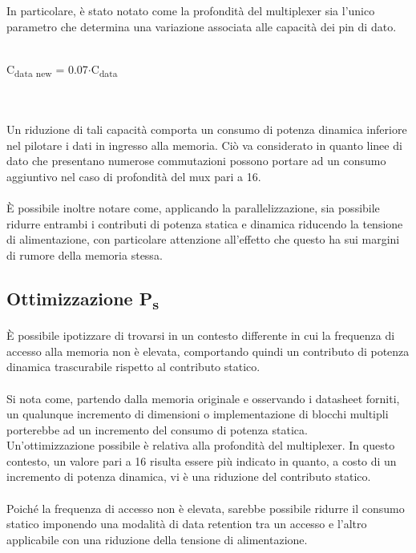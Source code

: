 \documentclass[11pt,  english, makeidx, a4paper, titlepage, oneside]{book}
\begin{document}
\\\\
In particolare, è stato notato come la profondità del multiplexer sia l'unico parametro che determina una variazione associata alle capacità dei pin di dato.
\\\\
\centerline{C\textsubscript{data new} = 0.07$\cdot$C\textsubscript{data}}
\\\\
Un riduzione di tali capacità comporta un consumo di potenza dinamica inferiore nel pilotare i dati in ingresso alla memoria. Ciò va considerato in quanto linee di dato che presentano numerose commutazioni possono portare ad un consumo aggiuntivo nel caso di profondità del mux pari a 16.
\\\\
È possibile inoltre notare come, applicando la parallelizzazione, sia possibile ridurre entrambi i contributi di potenza statica e dinamica riducendo la tensione di alimentazione, con particolare attenzione all'effetto che questo ha sui margini di rumore della memoria stessa.
\subsection{Ottimizzazione P\textsubscript{s}}
È possibile ipotizzare di trovarsi in un contesto differente in cui la frequenza di accesso alla memoria non è elevata, comportando quindi un contributo di potenza dinamica trascurabile rispetto al contributo statico.
\\\\
Si nota come, partendo dalla memoria originale e osservando i datasheet forniti, un qualunque incremento di dimensioni o implementazione di blocchi multipli porterebbe ad un incremento del consumo di potenza statica.
\\
Un'ottimizzazione possibile è relativa alla profondità del multiplexer. In questo contesto, un valore pari a 16 risulta essere più indicato in quanto, a costo di un incremento di potenza dinamica, vi è una riduzione del contributo statico.
\\\\
Poiché la frequenza di accesso non è elevata, sarebbe possibile ridurre il consumo statico imponendo una modalità di data retention tra un accesso e l'altro applicabile con una riduzione della tensione di alimentazione.
\end{document}
